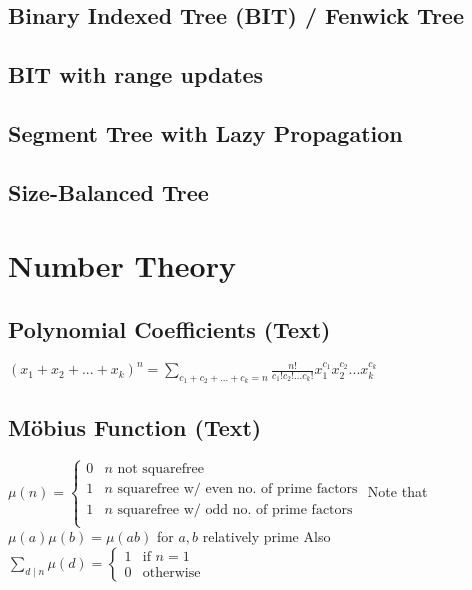 \documentclass[9pt]{extarticle}
\begin{document}
\begin{multicols}{3}
\subsection{Binary Indexed Tree (BIT) / Fenwick Tree}


\subsection{BIT with range updates}


\subsection{Segment Tree with Lazy Propagation}


\subsection{Size-Balanced Tree}


\section{Number Theory}
\subsection{Polynomial Coefficients (Text)}
$(x_1 + x_2 + ... + x_k)^n = \sum_{c_1 + c_2 + ... + c_k = n} \frac{n!}{c_1! c_2! ... c_k!} x_1^{c_1} x_2^{c_2} ... x_k^{c_k}$

\subsection{M\"obius Function (Text)}
$\mu(n) = \begin{cases}
0 & \text{$n$ not squarefree} \\
1 & \text{$n$ squarefree w/ even no. of prime factors} \\
1 & \text{$n$ squarefree w/ odd no. of prime factors} \\
\end{cases}$
Note that $\mu(a) \mu(b) = \mu(ab)$ for $a, b$ relatively prime
Also $\sum_{d \mid n} \mu(d) = \begin{cases} 1 & \text{if $n = 1$} \\ 0 & \text{otherwise} \end{cases}$


\end{multicols}
\end{document}
